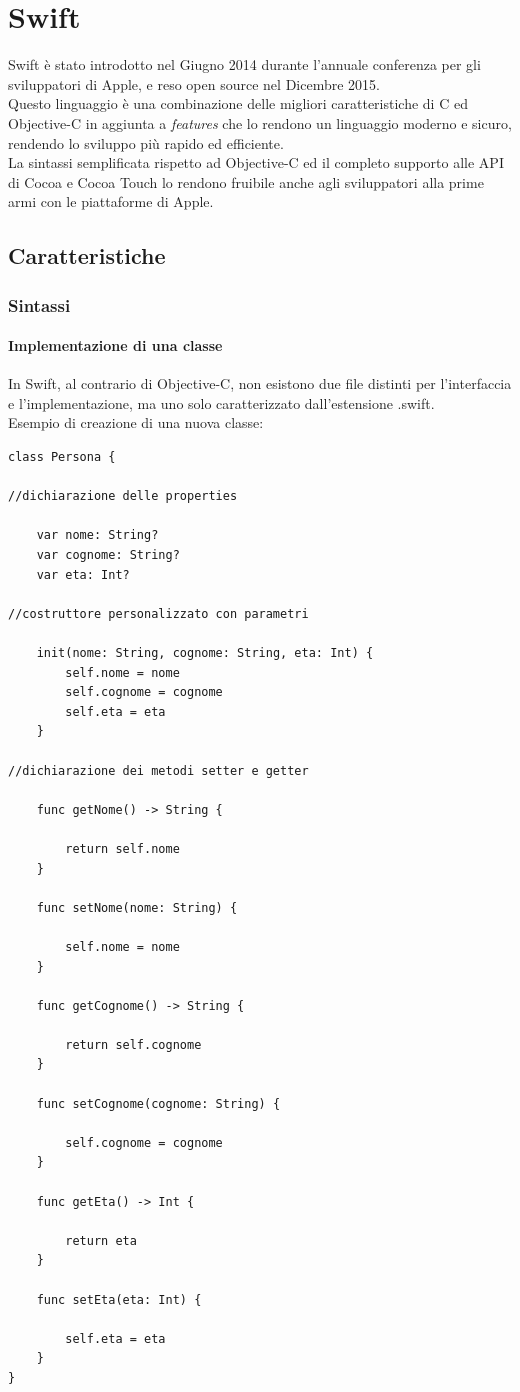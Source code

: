 \chapter{Swift}
Swift è stato introdotto nel Giugno 2014 durante l'annuale conferenza per gli sviluppatori di Apple, e reso open source nel Dicembre 2015.\\
Questo linguaggio è una combinazione delle migliori caratteristiche di C ed Objective-C in aggiunta a \textit{features} che lo rendono un linguaggio moderno e sicuro, rendendo lo sviluppo più rapido ed efficiente.\\La sintassi semplificata rispetto ad Objective-C ed il completo supporto alle API di Cocoa e Cocoa Touch lo rendono fruibile anche agli sviluppatori alla prime armi con le piattaforme di Apple.
\section{Caratteristiche}
\subsection{Sintassi}
\subsubsection{Implementazione di una classe}
In Swift, al contrario di Objective-C, non esistono due file distinti per l'interfaccia e l'implementazione, ma uno solo caratterizzato dall'estensione .swift.\\
Esempio di creazione di una nuova classe:\\
\lstset{language=[Objective]C, breakindent=40pt, breaklines}
\begin{lstlisting}
class Persona { 

//dichiarazione delle properties

	var nome: String? 
	var cognome: String? 
	var eta: Int?

//costruttore personalizzato con parametri 

	init(nome: String, cognome: String, eta: Int) {
		self.nome = nome
		self.cognome = cognome
		self.eta = eta
	}

//dichiarazione dei metodi setter e getter 

	func getNome() -> String {

		return self.nome
	}

	func setNome(nome: String) {

		self.nome = nome
	}

	func getCognome() -> String {

		return self.cognome
	}

	func setCognome(cognome: String) {
	
		self.cognome = cognome
	}

	func getEta() -> Int {
	
		return eta
	}

	func setEta(eta: Int) {

		self.eta = eta
	}
}
\end{lstlisting}
